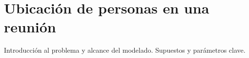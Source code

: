 
\section{Ubicación de personas en una reunión}\label{sec:05-reunion}
Introducción al problema y alcance del modelado.
Supuestos y parámetros clave.

